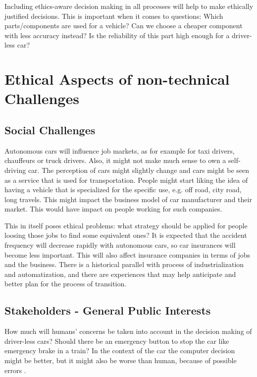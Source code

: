 Including ethics-aware decision making in all processes will help to make ethically justified decisions. This is important when it comes to questions: Which parts/components are used for a vehicle? Can we choose a cheaper component with less accuracy instead? Is the reliability of this part high enough for a driver-less car?



\section{Ethical Aspects of non-technical Challenges}
\label{sec:EAofNONTC}

\subsection{Social Challenges}
\label{sec:EAofNONTC:SocialChallenges}

Autonomous cars will influence job markets, as for example for taxi drivers, chauffeurs or truck drivers. Also, it might not make much sense to own a self-driving car. The perception of cars might slightly change and cars might be seen as a service that is used for transportation. People might start liking the idea of having a vehicle that is specialized for the specific use, e.g. off road, city road, long travels. This might impact the business model of car manufacturer and their market. This would have impact on people working for such companies.

This in itself poses ethical problems: what strategy should be applied for people loosing those jobs to find some equivalent ones? It is expected that the accident frequency will decrease rapidly with autonomous cars, so car insurances will become less important. This will also affect insurance companies in terms of jobs and the business. There is a historical parallel with process of industrialization and automatization, and there are experiences that may help anticipate and better plan for the process of transition.


\subsection{Stakeholders - General Public Interests}
\label{sec:EAofNONTC:Stakeholders}

How much will humans' concerns be taken into account in the decision making of driver-less cars? Should there be an emergency button to stop the car like emergency brake in a train? In the context of the car the computer decision might be better, but it might also be worse than human, because of possible errors \cite{Eckstein2016}.

